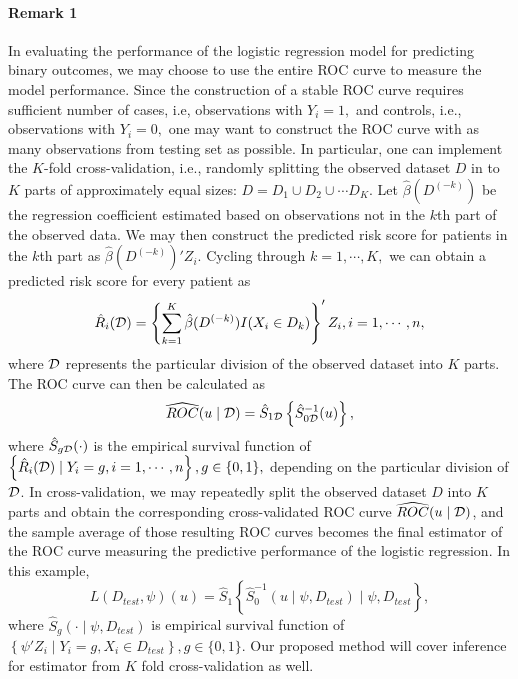 \documentclass[12pt]{article}
\begin{document}
\paragraph{Remark 1}
In evaluating the performance of the logistic regression model for predicting binary outcomes, we may choose to use the entire ROC curve to measure the model performance. Since the construction of a stable ROC curve requires sufficient number of cases, i.e, observations with $Y_i=1,$ and controls, i.e., observations with $Y_i=0,$ one may want to construct the ROC curve with as many observations from testing set as possible.  In particular, one can implement the $K$-fold cross-validation, i.e., randomly splitting the observed dataset $D$ in to $K$ parts of approximately equal sizes: $D=D_1\cup D_2 \cup \cdots D_K.$ Let $\hat{\beta}(D^{(-k)})$ be the regression coefficient estimated based on observations not in the $k$th part of the observed data. We may then construct the predicted risk score for patients in the $k$th part as 
$\hat{\beta}(D^{(-k)})'Z_i.$ Cycling through $k=1,\cdots, K,$ we can obtain a predicted risk score for every patient as
$$ \hat{R}_i({\cal D})=\left\{\sum_{k=1}^K \hat{\beta}(D^{(-k)})I(X_i\in D_k)\right\}'Z_i, i=1, \cdots, n,$$
where ${\cal D}$ represents the particular division of the observed dataset into $K$ parts.  The ROC curve can then be calculated as 
$$ \widehat{ROC}(u \mid {\cal D})=\hat{S}_{1{\cal D}}\left\{\hat{S}_{0{\cal D}}^{-1}(u)\right\},$$
where $\hat{S}_{g{\cal D}}(\cdot)$ is the empirical survival function of $\left\{\hat{R}_i({\cal D})\mid Y_i=g, i=1, \cdots, n\right\}, g\in \{0, 1\},$ depending on the particular division of ${\cal D}$. In cross-validation, we may repeatedly split the observed dataset $D$ into $K$ parts and obtain the corresponding cross-validated ROC curve $\widehat{ROC}(u\mid {\cal D})$, and the sample average of those resulting ROC curves becomes the final estimator of the ROC curve measuring the predictive performance of the logistic regression. In this example, 
$$L\left(D_{test}, \psi\right)(u)=\hat{S}_{1} \left\{\hat{S}_{0}^{-1}(u\mid \psi, D_{test} ) \mid \psi, D_{test} \right\},$$
where $\hat{S}_{g}(\cdot\mid \psi, D_{test})$ is empirical survival function of $\left\{\psi'Z_i \mid Y_i=g,  X_i\in D_{test}\right\}, g\in \{0, 1\}.$ Our proposed method will cover inference for estimator from $K$ fold cross-validation as well.
\end{document}
